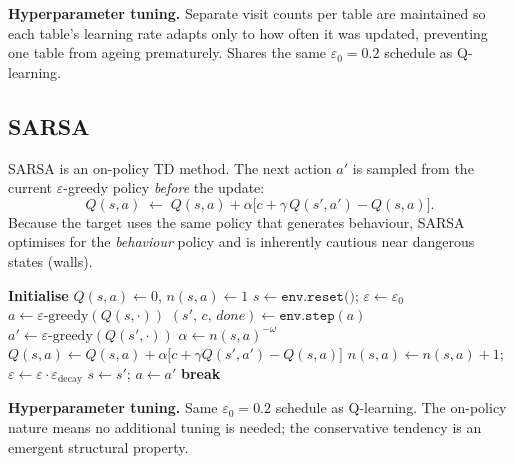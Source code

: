 \documentclass[11pt]{article}
\begin{document}
\textbf{Hyperparameter tuning.}  Separate visit counts per table are maintained
so each table's learning rate adapts only to how often it was updated,
preventing one table from ageing prematurely.  Shares the same
$\varepsilon_0=0.2$ schedule as Q-learning.

\subsection{SARSA}

SARSA is an on-policy TD method.  The next action
$a'$ is sampled from the current $\varepsilon$-greedy policy \emph{before}
the update:
\begin{equation}
    Q(s,a) \;\leftarrow\; Q(s,a) + \alpha\bigl[c + \gamma\, Q(s',a') - Q(s,a)\bigr].
\end{equation}
Because the target uses the same policy that generates behaviour, SARSA
optimises for the \emph{behaviour} policy and is inherently cautious near
dangerous states (walls).

\begin{algorithm}[H]
\caption{SARSA}
\label{alg:sarsa}
\begin{algorithmic}[1]
\State \textbf{Initialise} $Q(s,a)\leftarrow 0$,\; $n(s,a)\leftarrow 1$
    \State $s \leftarrow \texttt{env.reset()}$;\; $\varepsilon \leftarrow \varepsilon_0$
    \State $a \leftarrow \varepsilon\text{-greedy}(Q(s,\cdot))$ 
        \State $(s',\, c,\, \textit{done}) \leftarrow \texttt{env.step}(a)$
        \State $a' \leftarrow \varepsilon\text{-greedy}(Q(s',\cdot))$ 
        \State $\alpha \leftarrow n(s,a)^{-\omega}$
        \State $Q(s,a) \leftarrow Q(s,a) + \alpha\bigl[c + \gamma Q(s',a') - Q(s,a)\bigr]$
        \State $n(s,a)\leftarrow n(s,a)+1$;\; $\varepsilon\leftarrow\varepsilon\cdot\varepsilon_{\text{decay}}$
        \State $s\leftarrow s'$;\; $a\leftarrow a'$
         \textbf{break} \EndIf
    \EndFor
\EndFor
\end{algorithmic}
\end{algorithm}

\textbf{Hyperparameter tuning.}  Same $\varepsilon_0=0.2$ schedule as Q-learning.
The on-policy nature means no additional tuning is needed; the conservative
tendency is an emergent structural property.
\end{document}
